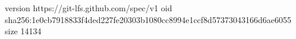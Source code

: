 version https://git-lfs.github.com/spec/v1
oid sha256:1e0cb7918833f4ded227fe20303b1080cc8994e1ccf8d57373043166d6ae6055
size 14134
